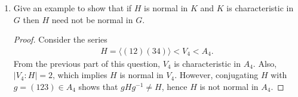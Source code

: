 \begin{enumerate}
  \item Give an example to show that if $H$ is normal in $K$ and $K$ is
    characteristic in $G$ then $H$ need not be normal in $G$.

    \begin{proof}
      Consider the series
      \begin{align*}
        H=\langle(12)(34)\rangle<V_4<A_4.
      \end{align*}
      From the previous part of this question, $V_4$ is characteristic in
      $A_4$. Also, $|V_4:H|=2$, which implies $H$ is normal in $V_4$.
      However, conjugating $H$ with $g=(123)\in A_4$ shows that
      $gHg^{-1}\neq H$, hence $H$ is not normal in $A_4$.
    \end{proof}
\end{enumerate}
